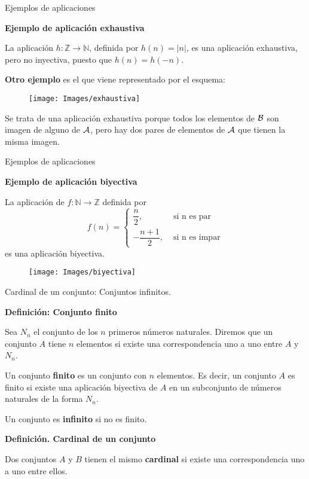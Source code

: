 \documentclass[ignorenonframetext,]{beamer}
\begin{document}
\begin{frame}{Ejemplos de aplicaciones}
\protect\hypertarget{ejemplos-de-aplicaciones-1}{}

\textbf{Ejemplo de aplicación exhaustiva}

La aplicación \(h: \mathbb{Z} \rightarrow \mathbb{N}\), definida por
\(h(n)=|n|\), es una aplicación exhaustiva, pero no inyectiva, puesto
que \(h(n)=h(-n)\).

\textbf{Otro ejemplo} es el que viene representado por el esquema:

\begin{figure}
\texttt{[image: Images/exhaustiva]} \end{figure}

Se trata de una aplicación exhaustiva porque todos los elementos de
\(\cal{B}\) son imagen de alguno de \(\cal{A}\), pero hay dos pares de
elementos de \(\cal{A}\) que tienen la misma imagen.

\end{frame}

\begin{frame}{Ejemplos de aplicaciones}
\protect\hypertarget{ejemplos-de-aplicaciones-2}{}

\textbf{Ejemplo de aplicación biyectiva}

La aplicación de \(f: \mathbb{N} \rightarrow \mathbb{Z}\) definida por
\[
f(n) =
\begin{cases}
\dfrac{n}{2}, &  \text{ si n es par}\\
-\dfrac{n+1}{2},&  \text{ si n es impar}
\end{cases}
\] es una aplicación biyectiva.

\begin{figure}
\texttt{[image: Images/biyectiva]} \end{figure}

\end{frame}

\begin{frame}{Cardinal de un conjunto: Conjuntos infinitos.}
\protect\hypertarget{cardinal-de-un-conjunto-conjuntos-infinitos.-2}{}

 \textbf{Definición: Conjunto finito}

Sea \(N_n\) el conjunto de los \(n\) primeros números naturales. Diremos
que un conjunto \(A\) tiene \(n\) elementos si existe una
correspondencia uno a uno entre \(A\) y \(N_n\).

Un conjunto \textbf{finito} es un conjunto con \(n\) elementos. Es
decir, un conjunto \(A\) es finito si existe una aplicación biyectiva de
\(A\) en un subconjunto de números naturales de la forma \(N_n\).

Un conjunto es \textbf{infinito} si no es finito.

 \textbf{Definición. Cardinal de un conjunto}

Dos conjuntos \(A\) y \(B\) tienen el mismo \textbf{cardinal} si existe
una correspondencia uno a uno entre ellos.

\end{frame}
\end{document}
